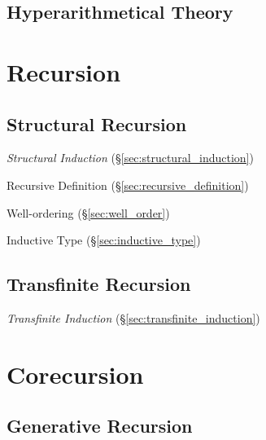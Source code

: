 \subsection{Hyperarithmetical Theory}\label{sec:hyperarithmetical_theory}



\section{Recursion}\label{sec:recursion}

\subsection{Structural Recursion}\label{sec:structural_recursion}

\emph{Structural Induction} (\S\ref{sec:structural_induction})

Recursive Definition (\S\ref{sec:recursive_definition})

Well-ordering (\S\ref{sec:well_order})

Inductive Type (\S\ref{sec:inductive_type})



\subsection{Transfinite Recursion}\label{sec:transfinite_recursion}

\emph{Transfinite Induction} (\S\ref{sec:transfinite_induction})



\section{Corecursion}\label{sec:corecursion}

\subsection{Generative Recursion}\label{sec:generative_recursion}
